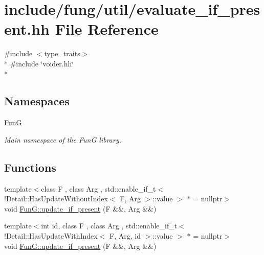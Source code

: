 \hypertarget{evaluate__if__present_8hh}{}\section{include/fung/util/evaluate\+\_\+if\+\_\+present.hh File Reference}
\label{evaluate__if__present_8hh}
{\ttfamily \#include $<$type\+\_\+traits$>$}\\*
{\ttfamily \#include \char`\"{}voider.\+hh\char`\"{}}\\*
\subsection*{Namespaces}
\begin{DoxyCompactItemize}
\item 
 \hyperlink{namespaceFunG}{FunG}
\begin{DoxyCompactList}\small\item\em Main namespace of the FunG library. \end{DoxyCompactList}\end{DoxyCompactItemize}
\subsection*{Functions}
\begin{DoxyCompactItemize}
\item 
{\footnotesize template$<$class F , class Arg , std\+::enable\+\_\+if\+\_\+t$<$!\+Detail\+::\+Has\+Update\+Without\+Index$<$ F, Arg $>$\+::value $>$ $\ast$  = nullptr$>$ }\\void \hyperlink{namespaceFunG_a3b9d2e5d07b30c2ee26703b33e9adb9e}{Fun\+G\+::update\+\_\+if\+\_\+present} (F \&\&, Arg \&\&)
\item 
{\footnotesize template$<$int id, class F , class Arg , std\+::enable\+\_\+if\+\_\+t$<$!\+Detail\+::\+Has\+Update\+With\+Index$<$ F, Arg, id $>$\+::value $>$ $\ast$  = nullptr$>$ }\\void \hyperlink{namespaceFunG_aed5ddbef97c98202e818bca2b74c75d2}{Fun\+G\+::update\+\_\+if\+\_\+present} (F \&\&, Arg \&\&)
\end{DoxyCompactItemize}
